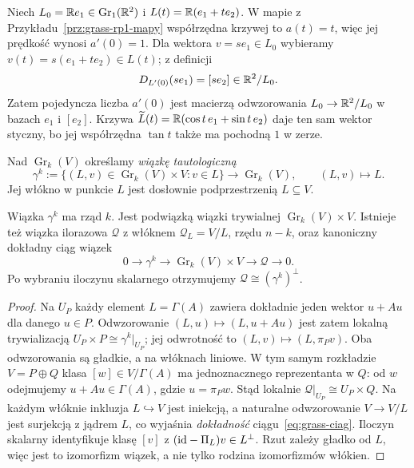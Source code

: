 \begin{przyklad}
Niech $L_0=\mathbb{R} e_1\in\operatorname{Gr}_1(\mathbb{R}^2)$ i
$L(t)=\mathbb{R}(e_1+t e_2)$. W mapie z
Przykładu~\ref{prz:grass-rp1-mapy}
współrzędna krzywej to $a(t)=t$, więc jej prędkość
wynosi $a'(0)=1$. Dla wektora $v=s e_1\in L_0$
wybieramy $v(t)=s(e_1+t e_2)\in L(t)$; z definicji
\[
 D_{L'(0)}(s e_1)=[s e_2]\in\mathbb{R}^2/L_0.
\]
Zatem pojedyncza liczba $a'(0)$ jest macierzą
odwzorowania $L_0\to\mathbb{R}^2/L_0$ w bazach
$e_1$ i $[e_2]$. Krzywa
$\widetilde L(t)=\mathbb{R}(\cos t\,e_1+\sin t\,e_2)$
daje ten sam wektor styczny, bo jej współrzędna
$\tan t$ także ma pochodną $1$ w zerze.
\end{przyklad}

\begin{definicja}
\label{def:grass-taut}
Nad $\operatorname{Gr}_k(V)$ określamy
\emph{wiązkę tautologiczną}
\[
 \gamma^k
 :=\{(L,v)\in\operatorname{Gr}_k(V)\times V:v\in L\}
 \longrightarrow\operatorname{Gr}_k(V),\qquad (L,v)\mapsto L.
\]
Jej włókno w punkcie $L$ jest dosłownie podprzestrzenią
$L\subseteq V$.
\end{definicja}

\begin{stwierdzenie}
\label{prop:grass-wiazki}
Wiązka $\gamma^k$ ma rząd $k$. Jest podwiązką
wiązki trywialnej $\operatorname{Gr}_k(V)\times V$.
Istnieje też wiązka ilorazowa $\mathcal Q$ z
włóknem $\mathcal Q_L=V/L$, rzędu $n-k$,
oraz kanoniczny dokładny ciąg wiązek
\begin{equation}\label{eq:grass-ciag}
 0\longrightarrow\gamma^k
 \longrightarrow\operatorname{Gr}_k(V)\times V
 \longrightarrow\mathcal Q\longrightarrow0.
\end{equation}
Po wybraniu iloczynu skalarnego otrzymujemy
$\mathcal Q\cong(\gamma^k)^\perp$.
\end{stwierdzenie}
\begin{proof}
Na $U_P$ każdy element $L=\Gamma(A)$ zawiera
dokładnie jeden wektor $u+Au$ dla danego $u\in P$.
Odwzorowanie $(L,u)\mapsto(L,u+Au)$ jest zatem lokalną
trywializacją $U_P\times P\cong\gamma^k|_{U_P}$;
jej odwrotność to $(L,v)\mapsto(L,\pi_Pv)$.
Oba odwzorowania są gładkie, a na włóknach liniowe.
W tym samym rozkładzie $V=P\oplus Q$ klasa
$[w]\in V/\Gamma(A)$ ma jednoznacznego
reprezentanta w $Q$: od $w$ odejmujemy
$u+Au\in\Gamma(A)$, gdzie $u=\pi_Pw$.
Stąd lokalnie $\mathcal Q|_{U_P}\cong U_P\times Q$.
Na każdym włóknie inkluzja $L\hookrightarrow V$
jest iniekcją, a naturalne odwzorowanie $V\to V/L$ jest
surjekcją z jądrem $L$, co wyjaśnia \emph{dokładność}
ciągu~\eqref{eq:grass-ciag}. Iloczyn skalarny
identyfikuje klasę $[v]$ z $(\mathrm{id}-\Pi_L)v\in L^\perp$.
Rzut zależy gładko od $L$, więc jest to izomorfizm wiązek,
a nie tylko rodzina izomorfizmów włókien.
\end{proof}

